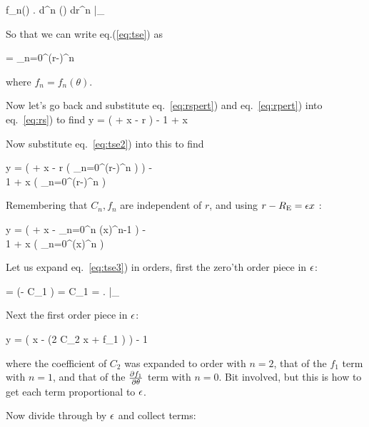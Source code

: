 \beq
\label{eq:fndef}
f_n(\theta)  \left. {d^n \psi(\theta) \over dr^n }\right|_{\re}
\eeq

So that we can write  eq.(\ref{eq:tse}) as

\beq
\label{eq:tse2}
\phi  = \sum_{n=0}^\infty {} (r-\re)^n
\eeq

where $f_n = f_n(\theta)$.


Now let's go back and substitute eq.~\eqref{eq:rspert}) and eq.~\eqref{eq:rpert}) into eq.~\eqref{eq:rs}) to find
\beq
\eps y = \left( \re + \eps x -  {\prtl  \phi \over \prtl r} \right)  - {1 \over \re + \eps x}  {\prtl  \phi \over \prtl \theta} \hat{\theta}
\eeq

Now substitute eq.~\eqref{eq:tse2}) into this to find

\bea
\eps y = \left( \re + \eps x -  {\prtl \over \prtl r} \left( \sum_{n=0}^\infty {} (r-\re)^n  \right) \right)  - \\
{1 \over \re + \eps x}  {\prtl  \over \prtl \theta} \left( \sum_{n=0}^\infty {} (r-\re)^n  \right)  \hat{\theta} \nonumber
\eea

Remembering that $C_n, f_n$ are independent of $r$, and using $r-R_{\mathrm{E}} = \epsilon x$ :

\bea
\label{eq:tse3}
\eps y = \left( \re + \eps x -   \sum_{n=0}^\infty {} n (\eps x)^{n-1}  \right)  - \\
{1 \over \re + \eps x}  {\prtl  \over \prtl \theta} \left( \sum_{n=0}^\infty {} (\eps x)^n  \right)  \hat{\theta} \nonumber
\eea

Let us expand eq.~\eqref{eq:tse3}) in orders, first the zero'th order piece in $\epsilon$:


 =  \left(\re - C_1 \right)  \rightarrow \re = C_1 = \left. \prtl \phi \over \prtl \theta \right|_{\re}
\eeq


Next the first order piece in $\epsilon$:

\beq
\eps y = \left( \eps x - (2 C_2 \eps x + \eps f_1 ) \right)  - {1 \over \re}  \hat{\theta}
\eeq

where the coefficient of $C_2$ was expanded to order with $n=2$, that of the $f_1$ term with $n=1$, and that of the $\partial f_1 \over \partial \theta$ term with $n=0$.  Bit involved, but this is how to get each term proportional to $\epsilon$.

Now divide through by $\epsilon$ and collect terms:

